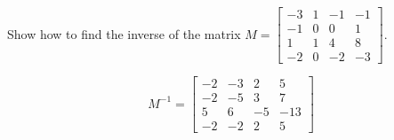 
\begin{exerciseStatement}


Show how to find the inverse of the matrix \(M= \left[\begin{array}{cccc}
-3 & 1 & -1 & -1 \\
-1 & 0 & 0 & 1 \\
1 & 1 & 4 & 8 \\
-2 & 0 & -2 & -3
\end{array}\right] \).


\end{exerciseStatement}
    
\begin{exerciseAnswer} 
\[M^{-1}= \left[\begin{array}{cccc}
-2 & -3 & 2 & 5 \\
-2 & -5 & 3 & 7 \\
5 & 6 & -5 & -13 \\
-2 & -2 & 2 & 5
\end{array}\right] \]
\end{exerciseAnswer}
    
